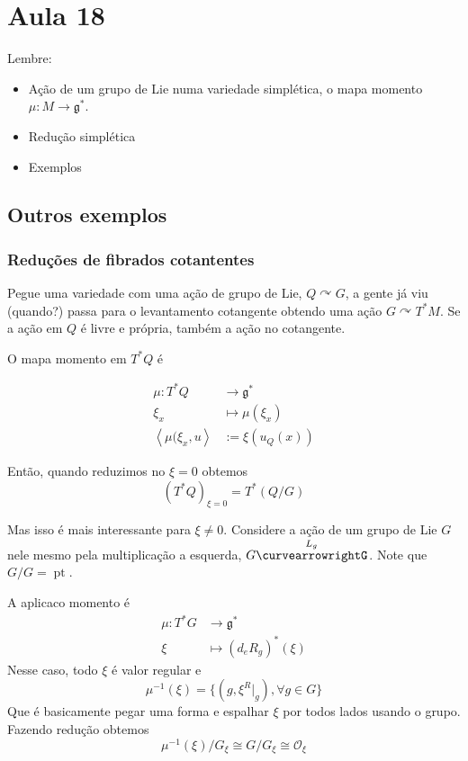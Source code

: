 \section{Aula 18}

Lembre:
\begin{itemize}
\item Ação de um grupo de Lie numa variedade simplética, o mapa momento $\mu:M\longrightarrow \mathfrak{g}^*$.
\item Redução simplética
\item Exemplos
\end{itemize}

\subsection{Outros exemplos}

\subsubsection{Reduções de fibrados cotantentes}

Pegue uma variedade com uma ação de grupo de Lie, $Q\curvearrowright G$, a gente já viu (quando?) passa para o levantamento cotangente obtendo uma ação $G\curvearrowright T^*M$. Se a ação em $Q$ é livre e própria, também a ação no cotangente.

O mapa momento em $T^*Q$ é

\begin{align*}
	\mu:T^*Q  &\longrightarrow \mathfrak{g}^* \\
	\xi_x &\longmapsto \mu(\xi_x)\\
	\left<\mu(\xi_x,u\right> &:=\xi(u_Q(x))
\end{align*}


Então, quando reduzimos no $\xi=0$ obtemos
\[(T^* Q)_{\xi=0}=T^*(Q/G)\]

Mas isso é mais interessante para $\xi\neq 0$. Considere a  ação de um grupo de Lie $G$ nele mesmo pela multiplicação a esquerda, $G\overset{L_g}{\curvearrowrightG}$. Note que $G/G=\operatorname{pt}$.

A aplicaco momento é
\begin{align*}
	\mu: T^*G &\longrightarrow \mathfrak{g}^* \\
	\xi &\longmapsto (d_eR_g)^*(\xi)
\end{align*}
Nesse caso, todo $\xi$ é valor regular e
\[\mu^{-1}(\xi)=\{(g,\xi^R|_{g}),\forall g\in G\}\]
Que é basicamente pegar uma forma e espalhar $\xi$ por todos lados usando o grupo. Fazendo redução obtemos
\[\mu^{-1}(\xi)/G_\xi\cong G/G_\xi\cong \mathcal{O}_\xi\]

